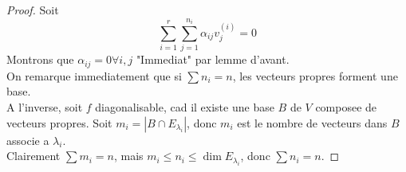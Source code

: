 \documentclass[../main.tex]{subfiles}
\begin{document}
\begin{proof}
Soit
\[ 
	\sum_{i=1}^{ r} \sum_{j=1}^{ n_i} \alpha_{ij} v_{j} ^{( i) }=0
\]
Montrons que $\alpha_{ij} = 0 \forall i,j$
"Immediat" par lemme d'avant.\\
On remarque immediatement que si $\sum n_i = n$, les vecteurs propres forment une base.\\
A l'inverse, soit $f$ diagonalisable, cad il existe une base $B$ de $V$ composee de vecteurs propres. Soit  $m_i = |B \cap E_{\lambda_{i} }| $, donc $m_i$ est le nombre de vecteurs dans $B$ associe a $\lambda_i$.\\
Clairement $\sum m_i = n$, mais $m_i \leq n_i \leq \dim E_{\lambda_i} $, donc $\sum n_i  = n$.

\end{proof}

	
\end{document}
